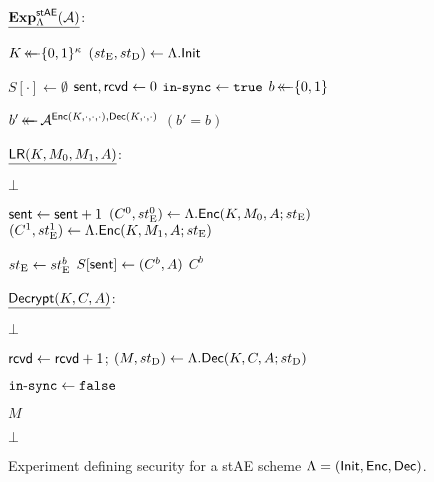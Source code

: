 \begin{figure}


\begin{adjustbox}{margin*=2ex,width=0.98\textwidth,frame,center}
	\begin{minipage}[t]{0.49\textwidth}
		$\underline{\mathbf{Exp}_{\Lambda}^{\mathsf{stAE}}(\mathcal{A})}$: 
		\begin{algorithmic}[1]
			\State $K \operatorname{\leftarrow\mathrel{\mkern-14mu}\leftarrow} \lbrace 0, 1 \rbrace^\kappa$
			\State $(st_{\mathrm{E}},st_{\mathrm{D}}) \gets \Lambda.\mathsf{Init}$
		
			\State $S[\cdot] \gets \emptyset$
			\State $\mathsf{sent}, \mathsf{rcvd} \gets 0$
			\State $\operatorname{\mathtt{in-sync}} \gets \mathtt{true}$
			\State $b \operatorname{\leftarrow\mathrel{\mkern-14mu}\leftarrow} \lbrace 0, 1 \rbrace$

			\State
			\State $b' \operatorname{\leftarrow\mathrel{\mkern-14mu}\leftarrow} \mathcal{A}^{\mathsf{Enc}(K, \cdot, \cdot, \cdot),\mathsf{Dec}(K, \cdot, \cdot)}$ 
			\State \Return $(b' = b)$
	

		\end{algorithmic}
	\end{minipage}
	
	\begin{minipage}[t]{0.49\textwidth}		
		$\underline{\mathsf{LR}(K, M_0, M_1, A)}$: 
		\begin{algorithmic}[1]
				\State \Return $\bot$
			\EndIf
			
			\State
			\State $\mathsf{sent} \gets \mathsf{sent} + 1$
			\State $(C^{0}, st_{\mathrm{E}}^{0}) \gets \Lambda.\mathsf{Enc}(K, M_0, A; st_{\mathrm{E}})$
			\State $(C^{1}, st_{\mathrm{E}}^{1}) \gets \Lambda.\mathsf{Enc}(K, M_1, A; st_{\mathrm{E}})$

			\State
			\State $st_{\mathrm{E}} \gets st_{\mathrm{E}}^b$
			\State $S[\mathsf{sent}] \gets (C^{b}, A)$
			\State
			\State \Return $C^b	$
	

		\end{algorithmic}

		\vspace*{1em}

		$\underline{\mathsf{Decrypt}(K, C, A)}$: 
		\begin{algorithmic}[1]

			
				\State \Return $\bot$
			\EndIf

			\State
			
			\State $\mathsf{rcvd} \gets \mathsf{rcvd} +1$;
			\State $(M, st_{\mathrm{D}}) \gets \Lambda.\mathsf{Dec}(K, C, A; st_{\mathrm{D}})$
			\State 

			\label{alg:stAE:experiment:Dec:check_synch}
				\State $\operatorname{\mathtt{in-sync}} \gets \mathtt{false}$
			\EndIf
			
			\State
			\If {$\phase = \FALSE$}
				\State \Return $M$
			\EndIf
			
			\State 	
			\State \Return $\bot$
		\end{algorithmic}
	\end{minipage}
\end{adjustbox}

\caption{Experiment defining security for a stAE scheme \mbox{$\Lambda = (\mathsf{Init}, \mathsf{Enc}, \mathsf{Dec})$}.}
\label{fig:stAE_security_experiment}

\end{figure}


